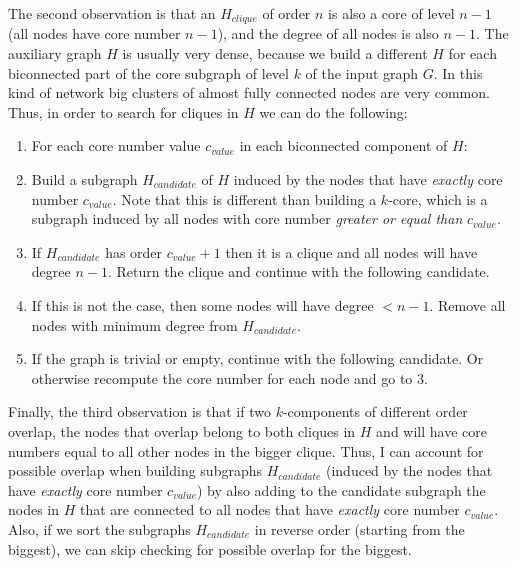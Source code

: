 The second observation is that an $H_{clique}$ of order $n$ is also a core of level $n-1$ (all nodes have core number $n-1$), and the degree of all nodes is also $n-1$. The auxiliary graph $H$ is usually very dense, because we build a different $H$ for each biconnected part of the core subgraph of level $k$ of the input graph $G$. In this kind of network big clusters of almost fully connected nodes are very common. Thus, in order to search for cliques in $H$ we can do the following:

\begin{enumerate}

\item For each core number value $c_{value}$ in each biconnected component of $H$:

\item Build a subgraph $H_{candidate}$ of $H$ induced by the nodes that have \emph{exactly} core number $c_{value}$. Note that this is different than building a $k$-core, which is a subgraph induced by all nodes with core number \emph{greater or equal than} $c_{value}$.

\item If $H_{candidate}$ has order $c_{value} + 1$ then it is a clique and all nodes will have degree $n - 1$. Return the clique and continue with the following candidate.

\item If this is not the case, then some nodes will have degree $< n - 1$. Remove all nodes with minimum degree from $H_{candidate}$.

\item If the graph is trivial or empty, continue with the following candidate. Or otherwise recompute the core number for each node and go to 3.

\end{enumerate}

Finally, the third observation is that if two $k$-components of different order overlap, the nodes that overlap belong to both cliques in $H$ and will have core numbers equal to all other nodes in the bigger clique. Thus, I can account for possible overlap when building subgraphs $H_{candidate}$ (induced by the nodes that have \emph{exactly} core number $c_{value}$) by also adding to the candidate subgraph the nodes in $H$ that are connected to all nodes that have \emph{exactly} core number $c_{value}$. Also, if we sort the subgraphs $H_{candidate}$ in reverse order (starting from the biggest), we can skip checking for possible overlap for the biggest.

